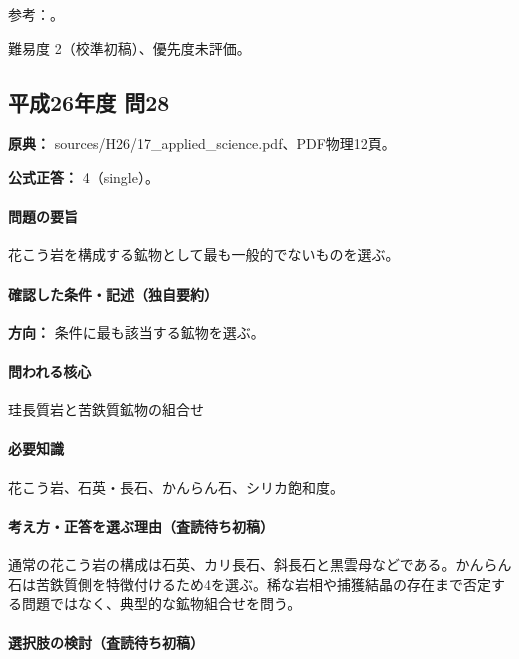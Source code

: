 \par 参考：\cite{hom_biotite,hom_quartz,hom_orthoclase,nelson_inosilicates}。

\par 難易度 2（校準初稿）、優先度未評価。

\subsection{平成26年度 問28}
\label{q:h26-reg-applied-28}

\noindent\textbf{原典：} sources/H26/17\_applied\_science.pdf、PDF物理12頁。

\textbf{公式正答：} 4（single）。

\paragraph{問題の要旨} 花こう岩を構成する鉱物として最も一般的でないものを選ぶ。

\paragraph{確認した条件・記述（独自要約）}\mbox{}\par

\noindent\textbf{方向：} 条件に最も該当する鉱物を選ぶ。\par

\paragraph{問われる核心} 珪長質岩と苦鉄質鉱物の組合せ

\paragraph{必要知識} 花こう岩、石英・長石、かんらん石、シリカ飽和度。

\paragraph{考え方・正答を選ぶ理由（査読待ち初稿）} 通常の花こう岩の構成は石英、カリ長石、斜長石と黒雲母などである。かんらん石は苦鉄質側を特徴付けるため4を選ぶ。稀な岩相や捕獲結晶の存在まで否定する問題ではなく、典型的な鉱物組合せを問う。

\paragraph{選択肢の検討（査読待ち初稿）}\mbox{}\par

